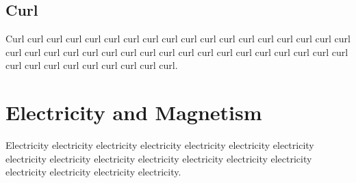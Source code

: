\subsection{Curl}

Curl curl curl curl curl curl curl curl curl curl curl curl curl curl curl
curl curl curl curl curl curl curl curl curl curl curl curl curl curl curl
curl curl curl curl curl curl curl curl curl curl curl curl curl curl curl.

\section{Electricity and Magnetism}

Electricity electricity electricity electricity electricity electricity
electricity electricity electricity electricity electricity electricity
electricity electricity electricity electricity electricity electricity.
